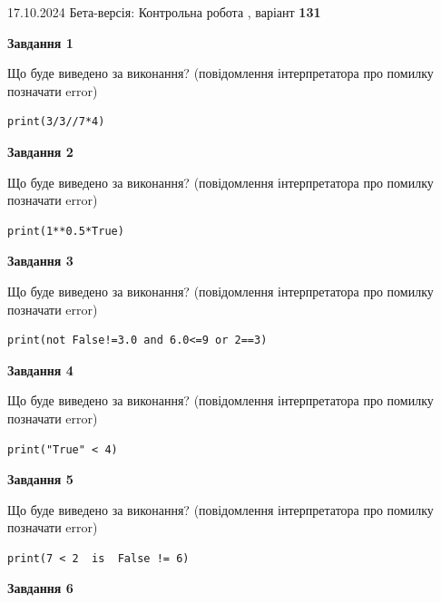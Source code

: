 \documentclass[12pt, ukrainian]{article}
\begin{document}
{\Large{17.10.2024 Бета-версія: Контрольна робота , варіант  \No \textbf { 131 }\par}}
{
\begin {large}
{\begin {center}\textbf{Завдання 1}\end {center}}

Що буде виведено за виконання? (повідомлення інтерпретатора про помилку позначати error)\par
\begin{verbatim}
print(3/3//7*4)
\end{verbatim}

{\begin {center}\textbf{Завдання 2}\end {center}}

Що буде виведено за виконання? (повідомлення інтерпретатора про помилку позначати error)\par
\begin{verbatim}
print(1**0.5*True)
\end{verbatim}

{\begin {center}\textbf{Завдання 3}\end {center}}

Що буде виведено за виконання? (повідомлення інтерпретатора про помилку позначати error)\par
\begin{verbatim}
print(not False!=3.0 and 6.0<=9 or 2==3)
\end{verbatim}

{\begin {center}\textbf{Завдання 4}\end {center}}

Що буде виведено за виконання? (повідомлення інтерпретатора про помилку позначати error)\par
\begin{verbatim}
print("True" < 4)
\end{verbatim}

{\begin {center}\textbf{Завдання 5}\end {center}}

Що буде виведено за виконання? (повідомлення інтерпретатора про помилку позначати error)\par
\begin{verbatim}
print(7 < 2  is  False != 6)
\end{verbatim}

{\begin {center}\textbf{Завдання 6}\end {center}}


\end{large}}
\end{document}
